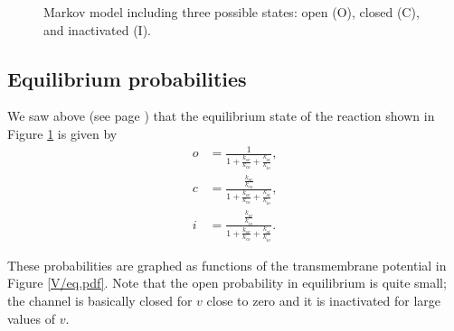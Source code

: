 \begin{figure}[ptb]
\begin{center}
\end{center}
\caption{Markov model including three possible states: open (O), closed (C), and
inactivated (I).}%
\label{Ionchannels_L/ICO.pdf}%
\end{figure}



\subsection{Equilibrium probabilities}

We saw above (see page \pageref{eq_prob_ioc}) that the  equilibrium state of the
reaction shown in Figure  \ref{Ionchannels_L/ICO.pdf} is given by
\begin{align*}
o  &  =\frac{1}{1+\frac{k_{oc}}{k_{co}}+\frac{k_{oi}}{k_{io}}},\\
c  &  =\frac{\frac{k_{oc}}{k_{co}}}{1+\frac{k_{oc}}{k_{co}}+\frac{k_{oi}%
}{k_{io}}},\\
i  &  =\frac{\frac{k_{oi}}{k_{io}}}{1+\frac{k_{oc}}{k_{co}}+\frac{k_{oi}%
}{k_{io}}}.
\end{align*}


These probabilities are graphed as functions of the transmembrane potential in Figure
\ref{V/eq.pdf}. Note that the open probability in equilibrium is quite small; the channel is basically closed
for $v$ close to zero and it is inactivated for large values of $v$.

